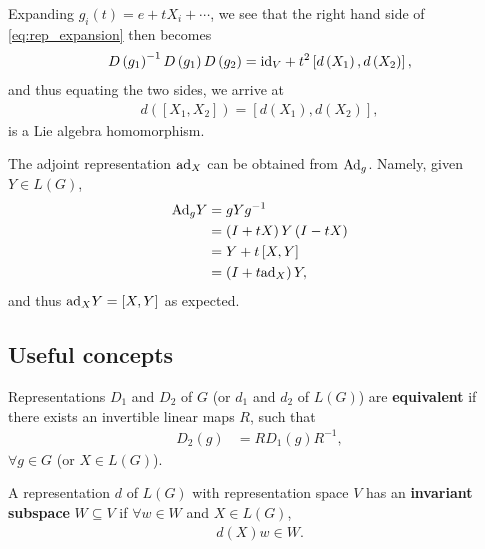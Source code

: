 Expanding $g_i \left( t \right) = e + t X_i + \cdots$, we see that the right hand side of \cref{eq:rep_expansion} then becomes
\begin{align}
D\left( g_1 \right)^{-1} D \left( g_1 \right) D \left( g_2 \right)  = \text{id}_V +  t^2 \left[ d \left( X_1 \right) , d\left( X_2 \right)  \right] 
,\end{align}
and thus equating the two sides, we arrive at
\begin{align}
    d \left( \left[ X_1, X_2 \right]  \right) = \left[ d \left( X_1 \right) , d\left( X_2 \right)  \right] 
,\end{align}
is a Lie algebra homomorphism. 


\begin{example}
    The adjoint representation $\text{ad}_X$ can be obtained from $\text{Ad}_g$. Namely, given $Y \in L \left( G \right) $, 
    \begin{align}
        \text{Ad}_g Y &= g Y g^{-1} \\
        &= \left( I + t X \right) Y \left( I - t X \right)  \\
        &= Y + t \left[ X, Y \right]  \\
        &= \left( I + t \text{ad}_X  \right) Y
    ,\end{align}
    and thus $\text{ad}_X Y = \left[ X, Y \right] $ as expected.
\end{example}

\subsection{Useful concepts}

\begin{definition}
    Representations $D_1$ and $D_2$ of $G$ (or $d_1$ and $d_2$ of $L\left( G \right) $) are \textbf{equivalent} if there exists an invertible linear maps $R$, such that
    \begin{align}
        D_2 \left( g \right) &= R D_1 \left( g \right) R^{-1} 
    ,\end{align}
    $\forall g \in G$ (or $X \in L \left( G \right) $).
\end{definition}

\begin{definition}
    A representation $d$ of $L \left( G \right) $ with representation space $V$ has an \textbf{invariant subspace} $W \subseteq V$ if $\forall  w \in W$ and $X \in L \left( G \right) $,
    \begin{align}
        d \left( X \right) w \in W
    .\end{align}
\end{definition}

